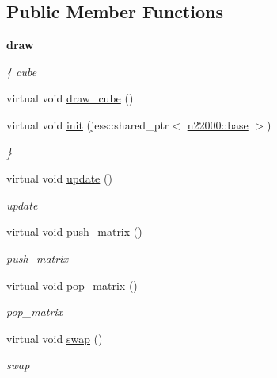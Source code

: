 \subsection*{Public Member Functions}
\begin{Indent}{\bf draw}\par
{\em \label{_amgrp817491bc777731f0f0c6e485f28e4d86}
 \{ cube }\begin{DoxyCompactItemize}
\item 
virtual void \hyperlink{classnebula_1_1platform_1_1renderer_1_1gl_1_1base_a4b143fe5c7fa7fe15dc0bf2f30630451}{draw\_\-cube} ()
\item 
virtual void \hyperlink{classnebula_1_1platform_1_1renderer_1_1gl_1_1base_affa88173c0ac23d9245a9addd721488b}{init} (jess::shared\_\-ptr$<$ \hyperlink{classnebula_1_1platform_1_1window_1_1base}{n22000::base} $>$)
\begin{DoxyCompactList}\small\item\em \} \item\end{DoxyCompactList}\item 
virtual void \hyperlink{classnebula_1_1platform_1_1renderer_1_1gl_1_1base_a9f5ba209a04711ace2516875da5c1aa3}{update} ()
\begin{DoxyCompactList}\small\item\em update \item\end{DoxyCompactList}\item 
virtual void \hyperlink{classnebula_1_1platform_1_1renderer_1_1gl_1_1base_add015b34e9567bfaca68a94c0cb76b06}{push\_\-matrix} ()
\begin{DoxyCompactList}\small\item\em push\_\-matrix \item\end{DoxyCompactList}\item 
virtual void \hyperlink{classnebula_1_1platform_1_1renderer_1_1gl_1_1base_a090d8f0a4b385b23d1576c43ea27e22e}{pop\_\-matrix} ()
\begin{DoxyCompactList}\small\item\em pop\_\-matrix \item\end{DoxyCompactList}\item 
virtual void \hyperlink{classnebula_1_1platform_1_1renderer_1_1gl_1_1base_a99776235861491abc4fa8fc5eec7ebf9}{swap} ()
\begin{DoxyCompactList}\small\item\em swap \item\end{DoxyCompactList}\item 

\end{DoxyCompactItemize}
\end{Indent}

